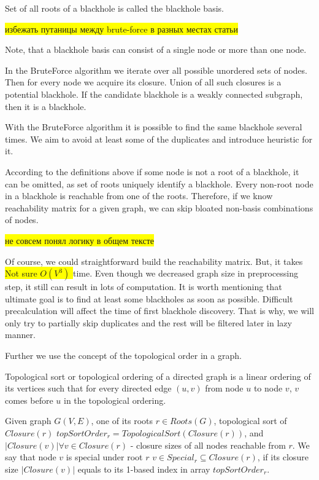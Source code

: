 \documentclass{svproc}
\newcommand{\FIXME}[1]{ %
	\colorbox{yellow}{#1}
}
\newcommand{\FIXME}[1]{ %
}
\begin{document}
\begin{definition}
Set of all roots of a blackhole is called the blackhole basis.
\end{definition}

\FIXME{избежать путаницы между brute-force в разных местах статьи}

Note, that a blackhole basis can consist of a single node or more than one node. 

In the BruteForce algorithm we iterate over all possible unordered sets of nodes. 
Then for every node we acquire its closure. Union of all such closures is a potential blackhole.
If the candidate blackhole is a weakly connected subgraph, then it is a blackhole.

With the BruteForce algorithm it is possible to find the same blackhole several times.
We aim to avoid at least some of the duplicates and introduce heuristic for it.

According to the definitions above if some node is not a root of a blackhole, it can be omitted, as set of roots uniquely identify a blackhole.
Every non-root node in a blackhole is reachable from one of the roots. Therefore, if we know reachability matrix for a given graph, we can skip bloated non-basis combinations of nodes.

\FIXME{не совсем понял логику в общем тексте}
Of course, we could straightforward build the reachability matrix. But, it takes \FIXME{ Not sure $O(V^3)$ } time. Even though we decreased graph size
in preprocessing step, it still can result in lots of computation. It is worth mentioning that ultimate goal is to find at least some blackholes as soon as possible. 
Difficult precalculation will affect the time of first blackhole discovery. That is why, we will only try to partially skip duplicates and the rest will
be filtered later in lazy manner.

Further we use the concept of the topological order in a graph.  

\begin{definition}
	Topological sort or topological ordering of a directed graph is a linear ordering of 
	its vertices such that for every directed edge $(u,v)$ from node $u$ to node $v$,
	$v$ comes before $u$ in the topological ordering.
\end{definition}

\begin{definition}
    Given graph $G(V, E)$, one of its roots $r \in Roots(G)$, topological sort of $Closure(r)$ $topSortOrder_r = TopologicalSort(Closure(r))$, and
    ${|Closure(v)| \forall v \in Closure(r)}$ - closure sizes of all nodes reachable from $r$. We say that node $v$ is special under root $r$
    $v \in Special_r \subseteq Closure(r)$, if its closure size $|Closure(v)|$ equals to its 1-based index in array $topSortOrder_r$.
\end{definition}
\end{document}
